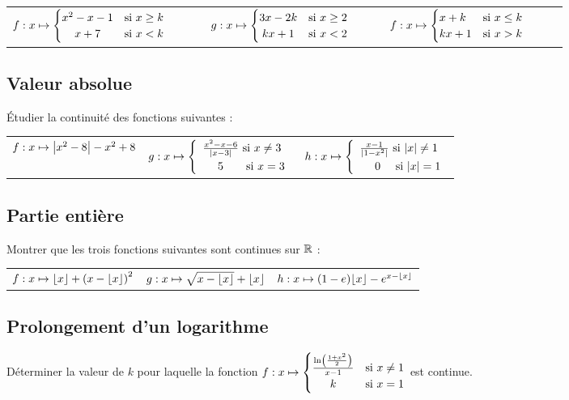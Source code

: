 \documentclass[oneside,12pt]{book}          %
\begin{document}
\begin{tabular}{p{0.3\linewidth}p{0.27\linewidth}p{0.27\linewidth}}
	$f:x\mapsto \begin{cases}
					x^2-x-1 & \text{si } x\geq k \\
					\hfil x+7 & \text{si } x<k
					\end{cases}$
	&
	$g:x\mapsto \begin{cases}
					3x-2k & \text{si } x\geq 2 \\
					\hfil kx+1 & \text{si } x<2
					\end{cases}$
	&
	$f:x\mapsto \begin{cases}
					x+k & \text{si } x\leq k \\
					\hfil kx+1 & \text{si } x>k
					\end{cases}$
\end{tabular}



\subsection{Valeur absolue}
Étudier la continuité des fonctions suivantes :

\begin{tabular}{p{} p{} p{}}
    $f:x\mapsto{\left\lvert x^2-8 \right\rvert}-x^2+8$ & 
    $g:x\mapsto \accolsized{\frac{x^2-x-6}{\abs{x-3}} \text{ si } x\neq3\\~~~~5 \text{ ~~~~~si }x =3}{1.3}$ &
    $h:x\mapsto\accolsized{\frac{x-1}{\abs{1-x^2}} \text{ si } \abs{x}\neq1\\~~~~ 0 \text{~~~~si } \abs{x}=1}{1.3}$
\end{tabular}



\subsection{Partie entière}
Montrer que les trois fonctions suivantes sont continues sur ${\mathbb R}$ :\\
\begin{tabular}{p{} p{} p{}}
    $f:x\mapsto{\lfloor x \rfloor}+\left(x-{\lfloor x \rfloor}\right)^2$ & $g:x\mapsto\sqrt{x-{\lfloor x \rfloor}}+{\lfloor x \rfloor}$ & $h:x\mapsto(1-e){\lfloor x \rfloor}-e^{x-{\lfloor x \rfloor}}$
\end{tabular}



\subsection{Prolongement d'un logarithme}
Déterminer la valeur de $k$ pour laquelle la fonction $f:x\mapsto\begin{cases}\frac{\ln\left(\frac{1+x^2}{2}\right)}{x-1} & \text{si } x\neq1 \\ \hfil k & \text{si } x=1 \end{cases}$ \quad est continue.
\end{document}

